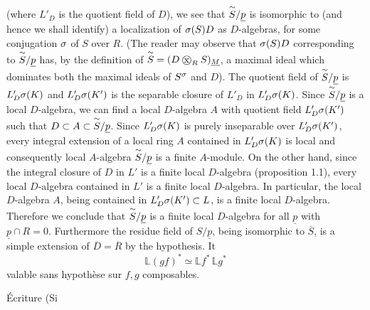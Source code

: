(where $L'_D$ is the quotient field of $D$), we see that $\overset{\sim}{S}/\underline p$ is isomorphic to (and
hence we shall identify) a localization of $\sigma(S)D$ as $D$-algebras, for some
conjugation $\sigma$ of $S$ over $R$. (The reader may observe that $\sigma(S)D$ corresponding
to $\overset{\sim}{S}/\underline p$ has, by the definition of $\overset{\handwritten{\sim}}{S}=(D\mathbin{\ooalign{\hfil$\mathrm{x}$\hfil\cr\hfil$\handwritten{\bigcirc}$\hfil\cr}}_R S)_{\underline M}$, a maximal ideal which
dominates both the maximal ideals of $S^{\sigma}$ and $D$). The quotient field of
$\overset{\sim}{S}/\underline p$ is $L'_D\sigma(K)$ and $L'_D\sigma(K')$ is the separable closure of $L'_D$ in
$L'_D\sigma(K)$. Since $\overset{\sim}{S}/\underline p$ is a local $D$-algebra, we can find a local $D$-algebra
$A$ with quotient field $L'_D\sigma(K')$ such that $D\subset A\subset \overset{\sim}{S}/\underline p$. Since $L'_D\sigma(K)$
is purely inseparable over $L'_D\sigma(K')$, every integral extension of a local
ring $A$ contained in $L'_D\sigma(K)$ is local and consequently local $A$-algebra
$\overset{\sim}{S}/\underline p$ is a finite $A$-module. On the other hand, since the integral closure
of $D$ in $L'$ is a finite local $D$-algebra (proposition 1.1), every local $D$-algebra
contained in $L'$ is a finite local $D$-algebra. In particular, the
local $D$-algebra $A$, being contained in $L'_D\sigma(K')\subset L$, is a finite local
$D$-algebra. Therefore we conclude that $\overset{\sim}{S}/\underline p$ is a finite local $D$-algebra
for all $\underline p$ with $\underline p\cap R=0$. Furthermore the residue field of $S/\underline p$, being
isomorphic to $\overline S$, is a simple extension of $\overline D=\overline R$ by the hypothesis. It
\[
\mathbb L(gf)^* \simeq \mathbb L f^*\,\mathbb L g^*
\]
valable sans hypothèse sur $f,g$ composables.

Écriture  (Si

